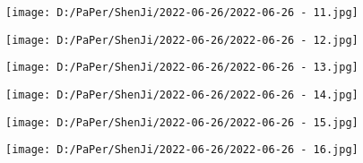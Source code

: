 \documentclass{article}
\begin{document}
\begin{figure}[h!]
	\centering
	\texttt{[image: D:/PaPer/ShenJi/2022-06-26/2022-06-26 - 11.jpg]}
\end{figure}

\begin{figure}[h!]
	\centering
	\texttt{[image: D:/PaPer/ShenJi/2022-06-26/2022-06-26 - 12.jpg]}
\end{figure}

\begin{figure}[h!]
	\centering
	\texttt{[image: D:/PaPer/ShenJi/2022-06-26/2022-06-26 - 13.jpg]}
\end{figure}

\begin{figure}[h!]
	\centering
	\texttt{[image: D:/PaPer/ShenJi/2022-06-26/2022-06-26 - 14.jpg]}
\end{figure}

\begin{figure}[h!]
	\centering
	\texttt{[image: D:/PaPer/ShenJi/2022-06-26/2022-06-26 - 15.jpg]}
\end{figure}

\begin{figure}[h!]
	\centering
	\texttt{[image: D:/PaPer/ShenJi/2022-06-26/2022-06-26 - 16.jpg]}
\end{figure}
\end{document}
